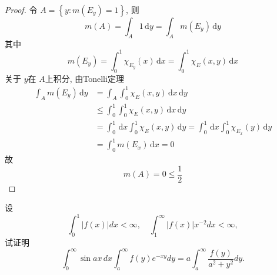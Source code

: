 \documentclass[../main.tex]{subfiles}
\begin{document}
\begin{proof}
  令 \(  A= \left\{ y: m\left( E_{y} \right)= 1  \right\}  \), 则 \[
 m\left( A \right)= \int_{A}1\,\mathrm{d} y=   \int_{A}m\left( E_{y} \right)\,\mathrm{d} y
  \] 其中 \[
  m\left( E_{y} \right)= \int_{0}^{1}\chi _{E_{y}}\left( x \right)\,\mathrm{d} x= \int_{0}^{1}\chi _{E}\left( x,y \right)\,\mathrm{d} x   
  \]关于 \(  y  \)在 \(  A  \)上积分, 由Tonelli定理 \[
  \begin{aligned}
  \int_{A}m\left( E_{y} \right)\,\mathrm{d} y&= \int_{A}\int_{0}^{1}\chi _{E}\left( x,y \right)\,\mathrm{d} x\,\mathrm{d} y \\ 
   & \le \int_{0}^{1}\int_{0}^{1}\chi _{E}\left( x,y \right)\,\mathrm{d} x\,\mathrm{d} y  \\ 
    &= \int_{0}^{1}\,\mathrm{d} x\int_{0}^{1}\chi _{E}\left( x,y \right)\,\mathrm{d} y= \int_{0}^{1}\,\mathrm{d} x \int_{0}^{1}\chi _{E_{x}}\left( y \right)\,\mathrm{d} y\\ 
     &= \int_{0}^{1}m\left( E_{x} \right)\,\mathrm{d} x= 0  
  \end{aligned}
  \]故 \[
  m\left( A \right)= 0 \le \frac{1}{2}
  \]
\end{proof}

\begin{exercise}{}{}
设
\[
\int_0^1|f(x)|dx<\infty,\quad\int_1^\infty|f(x)|x^{-2}dx<\infty,
\]
试证明
\[
\int_0^\infty\sin ax\,dx\int_a^\infty f(y)e^{-xy}dy
=a\int_a^\infty\frac{f(y)}{a^2+y^2}dy.
\]
\end{exercise} 
\end{document}
